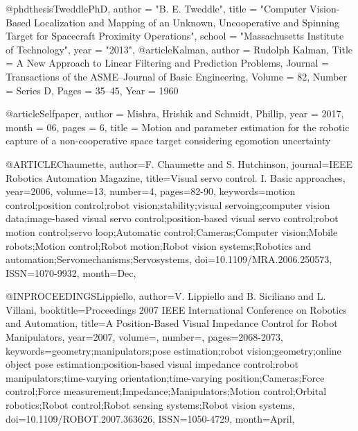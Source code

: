 @phdthesis{TweddlePhD,
    author  = "B. E. Tweddle",
    title   = "Computer Vision-Based Localization and Mapping of an Unknown, Uncooperative and Spinning Target for Spacecraft Proximity Operations",
    school  = "Massachusetts Institute of Technology",
    year    = "2013",
}
@article{Kalman,
    author = {Rudolph Kalman},
    Title = {A New Approach to Linear Filtering and Prediction Problems},
    Journal = {Transactions of the ASME--Journal of Basic Engineering},
    Volume = {82},
    Number = {Series D},
    Pages = {35--45},
    Year = {1960}
}

@article{Selfpaper,
author = {Mishra, Hrishik and Schmidt, Phillip},
year = {2017},
month = {06},
pages = {6},
title = {Motion and parameter estimation for the robotic capture of a non-cooperative space target considering egomotion uncertainty}
}

@ARTICLE{Chaumette,
author={F. Chaumette and S. Hutchinson},
journal={IEEE Robotics Automation Magazine},
title={Visual servo control. I. Basic approaches},
year={2006},
volume={13},
number={4},
pages={82-90},
keywords={motion control;position control;robot vision;stability;visual servoing;computer vision data;image-based visual servo control;position-based visual servo control;robot motion control;servo loop;Automatic control;Cameras;Computer vision;Mobile robots;Motion control;Robot motion;Robot vision systems;Robotics and automation;Servomechanisms;Servosystems},
doi={10.1109/MRA.2006.250573},
ISSN={1070-9932},
month={Dec},}

@INPROCEEDINGS{Lippiello,
author={V. Lippiello and B. Siciliano and L. Villani},
booktitle={Proceedings 2007 IEEE International Conference on Robotics and Automation},
title={A Position-Based Visual Impedance Control for Robot Manipulators},
year={2007},
volume={},
number={},
pages={2068-2073},
keywords={geometry;manipulators;pose estimation;robot vision;geometry;online object pose estimation;position-based visual impedance control;robot manipulators;time-varying orientation;time-varying position;Cameras;Force control;Force measurement;Impedance;Manipulators;Motion control;Orbital robotics;Robot control;Robot sensing systems;Robot vision systems},
doi={10.1109/ROBOT.2007.363626},
ISSN={1050-4729},
month={April},}
